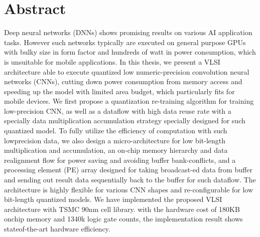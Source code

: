 \chapter{Abstract}
\label{ch:abstract}
Deep neural networks (DNNs) shows promising results on various AI application tasks. However such networks typically are executed on general purpose GPUs with bulky size in form factor and hundreds of watt in power consumption, which is unsuitable for mobile applications. In this thesis, we present a VLSI architecture able to execute quantized low numeric-precision convolution neural networks (CNNs), cutting down power consumption from memory access and speeding up the model with limited area budget, which particularly fits for mobile devices. We first propose a quantization re-training algorithm for training low-precision CNN, as well as a dataflow with high data reuse rate with a specially data multiplication accumulation strategy specially designed for such quantized model. To fully utilize the efficiency of computation with such lowprecision data, we also design a micro-architecture for low bit-length multiplication and accumulation, an on-chip memory hierarchy and data realignment flow for power saving and avoiding buffer bank-conflicts, and a processing element (PE) array designed for taking broadcast-ed data from buffer and sending out result data sequentially back to the buffer for such dataflow. The architecture is highly flexible for various CNN shapes and re-configurable for low bit-length quantized models. We have implemented the proposed VLSI architecture with TSMC 90nm cell library. with the hardware cost of 180KB onchip memory and 1340k logic gate counts, the implementation result shows stateof-the-art hardware efficiency.
